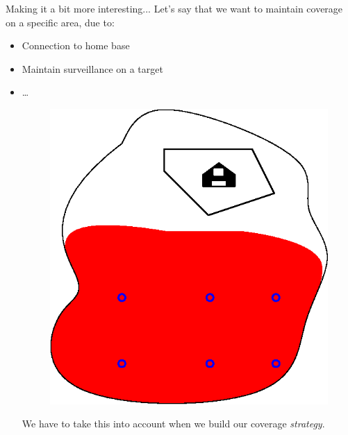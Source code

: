 \documentclass[t]{beamer}
\begin{document}
\begin{frame}[label=motivation10]{Making it a bit more interesting...}
Let's say that we want to maintain coverage on a specific area, due to:
\begin{itemize}
\item Connection to home base
\item Maintain surveillance on a target
\item \ldots
\begin{figure}[b]
\includegraphics[scale=0.4]{motivation/deployment-configuration-coverage-constraint.eps}
\end{figure}
We have to take this into account when we build our coverage \emph{strategy}.
\end{itemize}
\end{frame}
\end{document}
